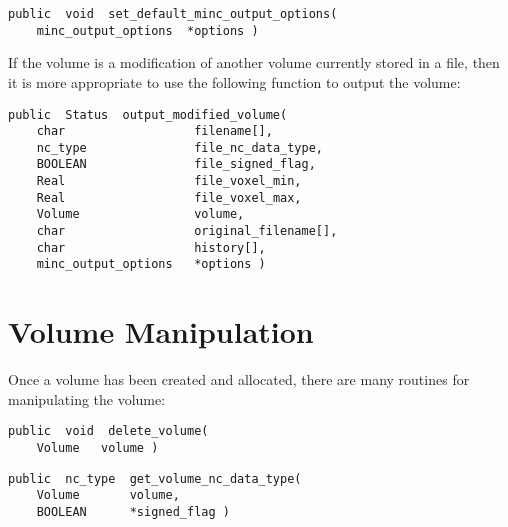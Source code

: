 {\bf\begin{verbatim}
public  void  set_default_minc_output_options(
    minc_output_options  *options )
\end{verbatim}}


If the volume is a modification of another volume currently stored in
a file, then it is more appropriate to use the following function to
output the volume:

{\bf\begin{verbatim}
public  Status  output_modified_volume(
    char                  filename[],
    nc_type               file_nc_data_type,
    BOOLEAN               file_signed_flag,
    Real                  file_voxel_min,
    Real                  file_voxel_max,
    Volume                volume,
    char                  original_filename[],
    char                  history[],
    minc_output_options   *options )
\end{verbatim}}


\section{Volume Manipulation}

Once a volume has been created and allocated, there are many routines
for manipulating the volume:

{\bf\begin{verbatim}
public  void  delete_volume(
    Volume   volume )
\end{verbatim}}


{\bf\begin{verbatim}
public  nc_type  get_volume_nc_data_type(
    Volume       volume,
    BOOLEAN      *signed_flag )
\end{verbatim}}

